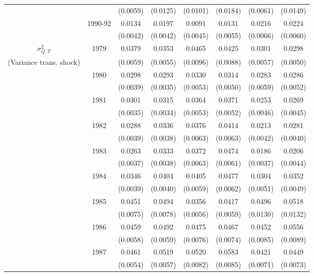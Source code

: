 \begin{table}
\begin{center}
{\begin{tabular}{cc|cc|cc|cc}
\\  &                    & (0.0059) & (0.0125)  & (0.0101) & (0.0184)  & (0.0061) & (0.0149) 
\\  & 1990-92 & 0.0134 &   0.0197 & 0.0091 &   0.0131 & 0.0216 &   0.0224 
\\  &         & (0.0042) & (0.0042) & (0.0045) & (0.0055) & (0.0066) & (0.0060) 
\\ \hline  
 $\sigma^2_{Q,T}$ & 1979      & 0.0379 &   0.0353 & 0.0465 &   0.0425 & 0.0301 &   0.0298 
\\ (Variance trans. shock) &     & (0.0059) & (0.0055) & (0.0096) & (0.0088) & (0.0057) & (0.0050) 
\\  & 1980 & 0.0298 &   0.0293 & 0.0330 &   0.0314 & 0.0283 &   0.0286
\\  &                    & (0.0039) & (0.0035)  & (0.0053) & (0.0050)  & (0.0059) & (0.0052) 
\\  & 1981 & 0.0301 &   0.0315 & 0.0364 &   0.0371 & 0.0253 &   0.0269
\\  &                    & (0.0035) & (0.0034)  & (0.0053) & (0.0052)  & (0.0046) & (0.0045) 
\\  & 1982 & 0.0288 &   0.0336 & 0.0376 &   0.0414 & 0.0213 &   0.0281
\\  &                    & (0.0039) & (0.0038)  & (0.0063) & (0.0063)  & (0.0042) & (0.0040) 
\\  & 1983 & 0.0263 &   0.0333 & 0.0372 &   0.0474 & 0.0186 &   0.0206
\\  &                    & (0.0037) & (0.0038)  & (0.0063) & (0.0061)  & (0.0037) & (0.0044) 
\\  & 1984 & 0.0346 &   0.0404 & 0.0405 &   0.0477 & 0.0304 &   0.0352
\\  &                    & (0.0039) & (0.0040)  & (0.0059) & (0.0062)  & (0.0051) & (0.0049) 
\\  & 1985 & 0.0451 &   0.0494 & 0.0356 &   0.0417 & 0.0496 &   0.0518
\\  &                    & (0.0075) & (0.0078)  & (0.0056) & (0.0059)  & (0.0130) & (0.0132) 
\\  & 1986 & 0.0459 &   0.0492 & 0.0475 &   0.0467 & 0.0452 &   0.0556
\\  &                    & (0.0058) & (0.0059)  & (0.0076) & (0.0074)  & (0.0085) & (0.0089) 
\\  & 1987 & 0.0461 &   0.0519 & 0.0520 &   0.0583 & 0.0421 &   0.0449
\\  &                    & (0.0054) & (0.0057)  & (0.0082) & (0.0085)  & (0.0071) & (0.0073) 

\end{tabular}}
\end{center}
\end{table}
